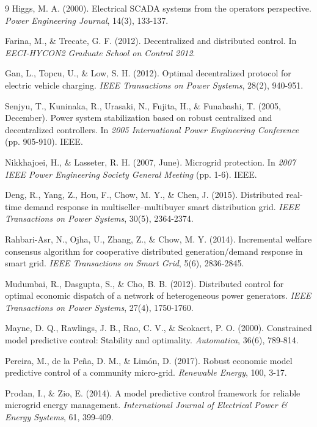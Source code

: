 \documentclass[final,3p,times]{elsarticle}
\begin{document}
\begin{thebibliography}{9}
Higgs, M. A. (2000). Electrical SCADA systems from the operators perspective. \textit{Power Engineering Journal}, 14(3), 133-137.

Farina, M., \& Trecate, G. F. (2012). Decentralized and distributed control. In \textit{EECI-HYCON2 Graduate School on Control 2012}.

Gan, L., Topcu, U., \& Low, S. H. (2012). Optimal decentralized protocol for electric vehicle charging. \textit{IEEE Transactions on Power Systems}, 28(2), 940-951.

Senjyu, T., Kuninaka, R., Urasaki, N., Fujita, H., \& Funabashi, T. (2005, December). Power system stabilization based on robust centralized and decentralized controllers. In \textit{2005 International Power Engineering Conference} (pp. 905-910). IEEE.

Nikkhajoei, H., \& Lasseter, R. H. (2007, June). Microgrid protection. In \textit{2007 IEEE Power Engineering Society General Meeting} (pp. 1-6). IEEE.

Deng, R., Yang, Z., Hou, F., Chow, M. Y., \& Chen, J. (2015). Distributed real-time demand response in multiseller–multibuyer smart distribution grid. \textit{IEEE Transactions on Power Systems}, 30(5), 2364-2374.

Rahbari-Asr, N., Ojha, U., Zhang, Z., \& Chow, M. Y. (2014). Incremental welfare consensus algorithm for cooperative distributed generation/demand response in smart grid. \textit{IEEE Transactions on Smart Grid}, 5(6), 2836-2845.

Mudumbai, R., Dasgupta, S., \& Cho, B. B. (2012). Distributed control for optimal economic dispatch of a network of heterogeneous power generators. \textit{IEEE Transactions on Power Systems}, 27(4), 1750-1760.

Mayne, D. Q., Rawlings, J. B., Rao, C. V., \& Scokaert, P. O. (2000). Constrained model predictive control: Stability and optimality. \textit{Automatica}, 36(6), 789-814.

Pereira, M., de la Peña, D. M., \& Limón, D. (2017). Robust economic model predictive control of a community micro-grid. \textit{Renewable Energy}, 100, 3-17.

Prodan, I., \& Zio, E. (2014). A model predictive control framework for reliable microgrid energy management. \textit{International Journal of Electrical Power \& Energy Systems}, 61, 399-409.


\end{thebibliography}
\end{document}
